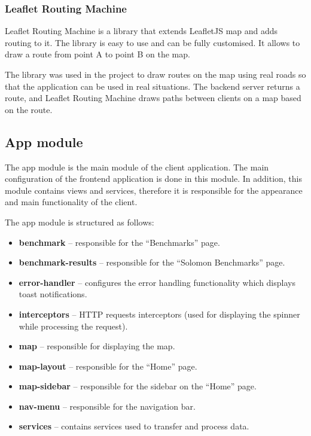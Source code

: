 \documentclass[a4paper,twoside,12pt]{book}
\begin{document}
\subsubsection{Leaflet Routing Machine}

Leaflet Routing Machine is a library that extends LeafletJS map and adds routing to it. The library is easy to use and can be fully customised. It allows to draw a route from point A to point B on the map.

The library was used in the project to draw routes on the map using real roads so that the application can be used in real situations. The backend server returns a route, and Leaflet Routing Machine draws paths between clients on a map based on the route.

\subsection{App module}

The app module is the main module of the client application. The main configuration of the frontend application is done in this module. In addition, this module contains views and services, therefore it is responsible for the appearance and main functionality of the client. 

The app module is structured as follows: 

\begin{itemize}
    \item \textbf{benchmark} -- responsible for the ``Benchmarks'' page.
    \item \textbf{benchmark-results} -- responsible for the ``Solomon Benchmarks'' page.
    \item \textbf{error-handler} -- configures the error handling functionality which displays toast notifications.
    \item \textbf{interceptors} -- HTTP requests interceptors (used for displaying the spinner while processing the request).
    \item \textbf{map} -- responsible for displaying the map.
    \item \textbf{map-layout} -- responsible for the ``Home'' page.
    \item \textbf{map-sidebar} -- responsible for the sidebar on the ``Home'' page.
    \item \textbf{nav-menu} -- responsible for the navigation bar.
    \item \textbf{services} -- contains services used to transfer and process data.    
\end{itemize}
\end{document}
